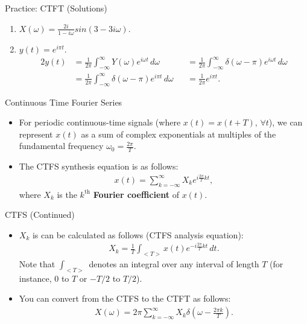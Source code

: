\begin{frame}{Practice: CTFT (Solutions)}
    \begin{enumerate}
        \item {\color{red} $X(\omega) = \frac{2i}{1 - i\omega} sin(3 - 3i\omega).$}
        \item {\color{red} $y(t) = e^{i\pi t}.$}
        {\color{blue}
        \begin{alignat*}{2}
            y(t) &= \frac{1}{2\pi} \int_{-\infty}^{\infty} Y(\omega) e^{i\omega t} \, d\omega 
            &&= \frac{1}{2\pi} \int_{-\infty}^{\infty} \delta(\omega - \pi)  e^{i\omega t} \, d\omega \\
            &= \frac{1}{2\pi} \int_{-\infty}^{\infty} \delta(\omega - \pi)  e^{i\pi t} \, d\omega
            &&= \frac{1}{2\pi} e^{i\pi t}.
        \end{alignat*}
        }
    \end{enumerate}
\end{frame}

\begin{frame}{Continuous Time Fourier Series}
    \begin{itemize}
        \item For periodic continuous-time signals (where $x(t) = x(t + T),\, \forall t$), we can represent $x(t)$ as a sum of complex exponentials at multiples of the fundamental frequency $\omega_0 = \frac{2\pi}{T}$.
        \item The CTFS synthesis equation is as follows:
        \begin{align*}
            x(t) = \sum_{k = -\infty}^\infty X_k e^{i \frac{2\pi}{T}kt},
        \end{align*}
        where $X_k$ is the $k^{\text{th}}$ \textbf{Fourier coefficient} of $x(t)$.
    \end{itemize}
\end{frame}

\begin{frame}{CTFS (Continued)}
    \begin{itemize}
        \item $X_k$ is can be calculated as follows (CTFS analysis equation):
        \begin{align*}
            X_k = \frac{1}{T}\int_{<T>} x(t) e^{-i \frac{2\pi}{T}kt}\, dt.
        \end{align*}
        Note that $\int_{<T>}$ denotes an integral over any interval of length $T$ (for instance, $0$ to $T$ or $-T/2$ to $T/2$).
        \item You can convert from the CTFS to the CTFT as follows:
        \begin{align*}
            X(\omega) = 2\pi \sum_{k = -\infty}^\infty X_k \delta(\omega - \frac{2\pi k}{T}).
        \end{align*}
    \end{itemize}
\end{frame}

